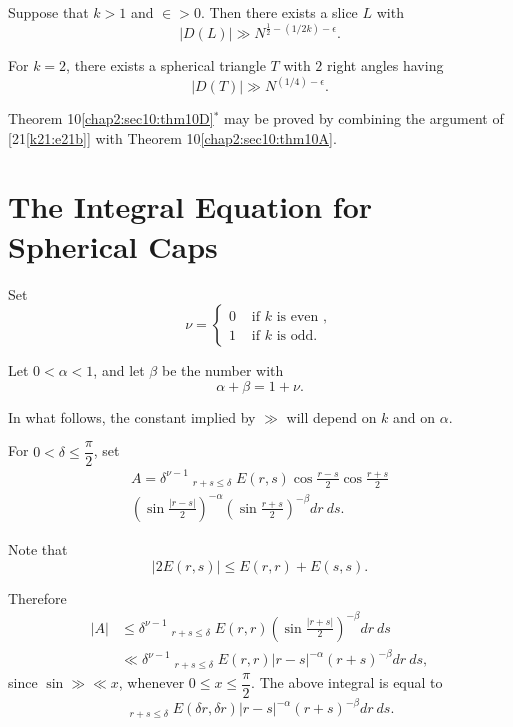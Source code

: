 \begin{theorem}[ $^*$]\label{chap2:sec10:thm10D}
Suppose that $k > 1$ and $\in > 0$. Then there exists a slice $L$ with
\begin{equation*}
|D(L)| \gg N^{\frac{1}{2}-(1/2k)-\epsilon}.
\end{equation*}
\end{theorem}

For $k = 2$, there exists a spherical triangle $T$ with $2$ right angles having
$$
|D(T)| \gg N^{(1/4)-\epsilon} .
$$

Theorem 10\ref{chap2:sec10:thm10D}$^*$
may be proved by combining the argument of [21\ref{k21:e21b}] with  Theorem 10\ref{chap2:sec10:thm10A}.


\section{The Integral Equation for Spherical Caps}\label{chap2:sec11}

Set\pageoriginale 
\begin{equation*}
\nu =
\begin{cases}
0 & \text{ if } k \text{ is even },\\
1 & \text{ if } k \text{ is odd}.
\end{cases}
\end{equation*}

Let $0 < \alpha < 1$, and let $\beta$ be the number with
$$
\alpha + \beta = 1 + \nu.
$$

In what follows, the constant implied by $\gg$ will depend on $k$ and on $\alpha$. 

For $0 < \delta \leq \dfrac{\pi}{2}$, set
\begin{multline*}
A = \delta^{\nu-1} \mathop{\int_{0}^{\delta} \int_{0}^{\delta}}_{r+s\leq \delta} E(r, s) \cos \frac{r-s}{2} \cos \frac{r+s}{2}\\ 
\left(\sin \frac{|r-s|}{2}\right)^{-\alpha} \left(\sin \frac{r+s}{2}\right)^{-\beta} dr~ds.
\end{multline*}

Note that 
$$
|2 E(r, s)|\leq E(r, r) + E(s, s). 
$$

Therefore
\begin{align*}
|A| & \leq \delta^{\nu-1} \mathop{\int_{0}^{\delta} \int_{0}^{\delta}}_{r+s\leq \delta} E(r, r) \left(\sin \frac{|r+s|}{2}\right)^{-\beta} dr~ ds\\
& \ll \delta^{\nu-1} \mathop{\int_{0}^{\delta} \int_{0}^{\delta}}_{r+s\leq \delta} E(r, r) |r-s|^{-\alpha} (r+s)^{-\beta} dr ~ds,
\end{align*}
since $\sin \gg \ll x$, whenever $0 \leq x \leq \dfrac{\pi}{2}$. The above integral is equal to 
$$
\mathop{\int_{0}^{\delta} \int_{0}^{\delta}}_{r+s\leq \delta} E(\delta r, \delta r) |r-s|^{-\alpha} (r+s)^{-\beta} dr ~ds.
$$

